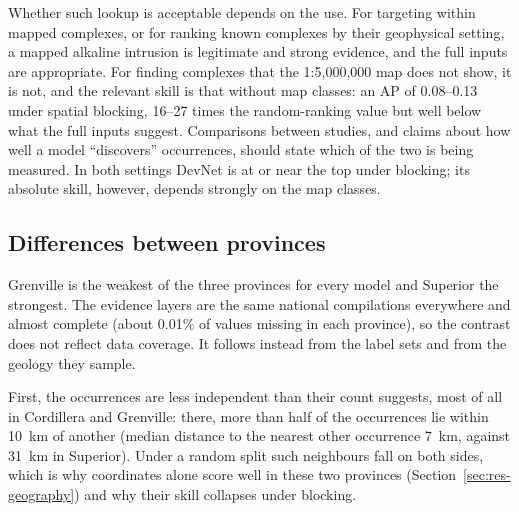 \documentclass[pdflatex,sn-apa]{sn-jnl}
\begin{document}
Whether such lookup is acceptable depends on the use. For targeting within mapped complexes, or for ranking known complexes by their geophysical setting, a mapped alkaline intrusion is legitimate and strong evidence, and the full inputs are appropriate. For finding complexes that the 1:5,000,000 map does not show, it is not, and the relevant skill is that without map classes: an AP of 0.08--0.13 under spatial blocking, 16--27 times the random-ranking value but well below what the full inputs suggest. Comparisons between studies, and claims about how well a model ``discovers'' occurrences, should state which of the two is being measured. In both settings DevNet is at or near the top under blocking; its absolute skill, however, depends strongly on the map classes.

\subsection{Differences between provinces}\label{sec:disc-provinces}

Grenville is the weakest of the three provinces for every model and Superior the strongest. The evidence layers are the same national compilations everywhere and almost complete (about 0.01\% of values missing in each province), so the contrast does not reflect data coverage. It follows instead from the label sets and from the geology they sample.

First, the occurrences are less independent than their count suggests, most of all in Cordillera and Grenville: there, more than half of the occurrences lie within 10~km of another (median distance to the nearest other occurrence 7~km, against 31~km in Superior). Under a random split such neighbours fall on both sides, which is why coordinates alone score well in these two provinces (Section~\ref{sec:res-geography}) and why their skill collapses under blocking.
\end{document}
